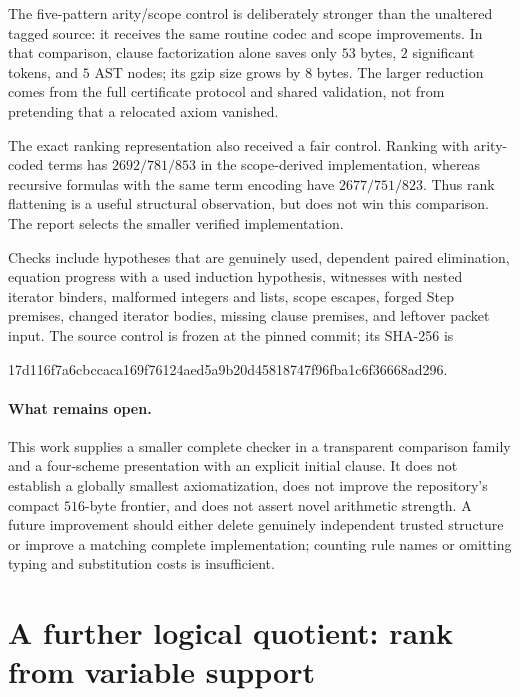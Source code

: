 \documentclass[11pt]{article}
\theoremstyle{definition}
\begin{document}

The five-pattern arity/scope control is deliberately stronger than the
unaltered tagged source: it receives the same routine codec and scope
improvements. In that comparison, clause factorization alone saves only
$53$ bytes, $2$ significant tokens, and $5$ AST nodes; its gzip size grows
by $8$ bytes. The larger reduction comes from the full certificate protocol
and shared validation, not from pretending that a relocated axiom vanished.

The exact ranking representation also received a fair control. Ranking
with arity-coded terms has $2692/781/853$ in the scope-derived implementation,
whereas recursive formulas with the same term encoding have $2677/751/823$.
Thus rank flattening is a useful structural observation, but does not win
this comparison. The report selects the smaller verified implementation.


Checks include hypotheses that are genuinely used, dependent paired
elimination, equation progress with a used induction hypothesis, witnesses
with nested iterator binders, malformed integers and lists, scope escapes,
forged Step premises, changed iterator bodies, missing clause premises,
and leftover packet input. The source control is frozen at the pinned
commit; its SHA-256 is
\begin{center}\ttfamily\scriptsize
17d116f7a6cbccaca169f76124aed5a9b20d45818747f96fba1c6f36668ad296.
\end{center}

\paragraph{What remains open.}
This work supplies a smaller complete checker in a transparent comparison
family and a four-scheme presentation with an explicit initial clause.
It does not establish a globally smallest axiomatization, does not improve
the repository's compact $516$-byte frontier, and does not assert novel
arithmetic strength. A future improvement should either delete genuinely
independent trusted structure or improve a matching complete implementation;
counting rule names or omitting typing and substitution costs is insufficient.

\section{A further logical quotient: rank from variable support}
\end{document}
